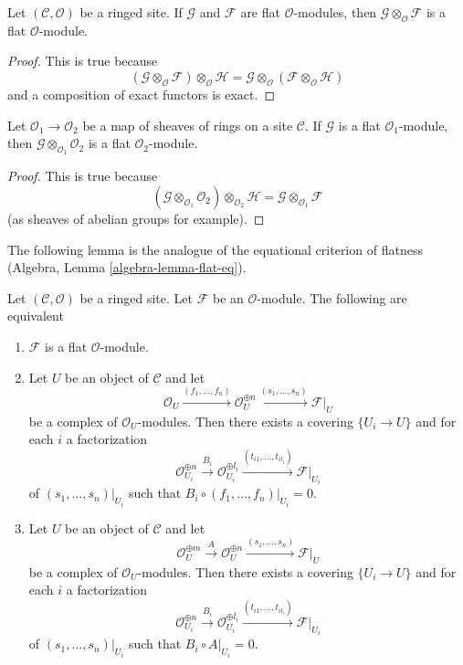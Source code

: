 \begin{lemma}
\label{lemma-tensor-flats}
Let $(\mathcal{C}, \mathcal{O})$ be a ringed site. If $\mathcal{G}$ and
$\mathcal{F}$ are flat $\mathcal{O}$-modules, then
$\mathcal{G} \otimes_\mathcal{O} \mathcal{F}$ is a flat $\mathcal{O}$-module.
\end{lemma}

\begin{proof}
This is true because
$$
(\mathcal{G} \otimes_\mathcal{O} \mathcal{F}) \otimes_\mathcal{O} \mathcal{H}
=
\mathcal{G} \otimes_\mathcal{O} (\mathcal{F} \otimes_\mathcal{O} \mathcal{H})
$$
and a composition of exact functors is exact.
\end{proof}

\begin{lemma}
\label{lemma-flat-change-of-rings}
Let $\mathcal{O}_1 \to \mathcal{O}_2$ be a map of sheaves
of rings on a site $\mathcal{C}$. If $\mathcal{G}$ is a
flat $\mathcal{O}_1$-module, then
$\mathcal{G} \otimes_{\mathcal{O}_1} \mathcal{O}_2$
is a flat $\mathcal{O}_2$-module.
\end{lemma}

\begin{proof}
This is true because
$$
(\mathcal{G} \otimes_{\mathcal{O}_1} \mathcal{O}_2)
\otimes_{\mathcal{O}_2} \mathcal{H}
=
\mathcal{G} \otimes_{\mathcal{O}_1} \mathcal{F}
$$
(as sheaves of abelian groups for example).
\end{proof}

\noindent
The following lemma is the analogue of the equational criterion of
flatness (Algebra, Lemma \ref{algebra-lemma-flat-eq}).

\begin{lemma}
\label{lemma-flat-eq}
Let $(\mathcal{C}, \mathcal{O})$ be a ringed site. Let $\mathcal{F}$ be an
$\mathcal{O}$-module. The following are equivalent
\begin{enumerate}
\item $\mathcal{F}$ is a flat $\mathcal{O}$-module.
\item Let $U$ be an object of $\mathcal{C}$ and let
$$
\mathcal{O}_U \xrightarrow{(f_1, \ldots, f_n)}
\mathcal{O}_U^{\oplus n} \xrightarrow{(s_1, \ldots, s_n)}
\mathcal{F}|_U
$$
be a complex of $\mathcal{O}_U$-modules. Then there exists a covering
$\{U_i \to U\}$ and for each $i$ a factorization
$$
\mathcal{O}_{U_i}^{\oplus n}
\xrightarrow{B_i}
\mathcal{O}_{U_i}^{\oplus l_i} \xrightarrow{(t_{i1}, \ldots, t_{il_i})}
\mathcal{F}|_{U_i}
$$
of $(s_1, \ldots, s_n)|_{U_i}$ such that
$B_i \circ (f_1, \ldots, f_n)|_{U_i} = 0$.
\item Let $U$ be an object of $\mathcal{C}$ and let
$$
\mathcal{O}_U^{\oplus m} \xrightarrow{A}
\mathcal{O}_U^{\oplus n} \xrightarrow{(s_1, \ldots, s_n)}
\mathcal{F}|_U
$$
be a complex of $\mathcal{O}_U$-modules. Then there exists a covering
$\{U_i \to U\}$ and for each $i$ a factorization
$$
\mathcal{O}_{U_i}^{\oplus n}
\xrightarrow{B_i}
\mathcal{O}_{U_i}^{\oplus l_i} \xrightarrow{(t_{i1}, \ldots, t_{il_i})}
\mathcal{F}|_{U_i}
$$
of $(s_1, \ldots, s_n)|_{U_i}$ such that
$B_i \circ A|_{U_i} = 0$.
\end{enumerate}
\end{lemma}

